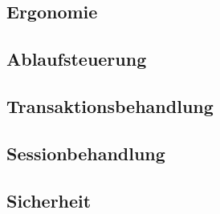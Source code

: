 \subsection{Ergonomie}

\subsection{Ablaufsteuerung}

\subsection{Transaktionsbehandlung}

\subsection{Sessionbehandlung}

\subsection{Sicherheit}

